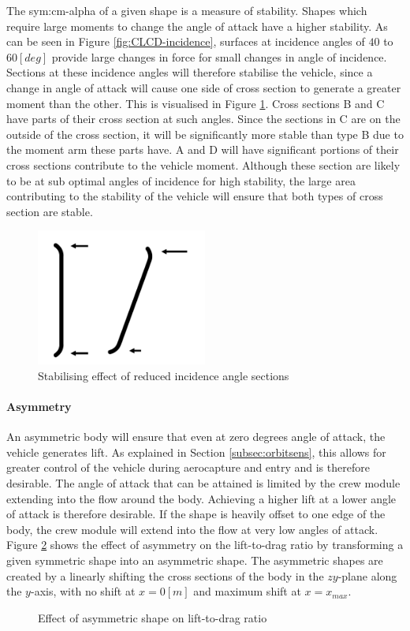 The \gls{sym:cm-alpha} of a given shape is a measure of stability. Shapes which require large moments to change the angle of attack have a higher stability. As can be seen in Figure \ref{fig:CLCD-incidence}, surfaces at incidence angles of $40$ to $60 \left[deg\right]$ provide large changes in force for small changes in angle of incidence. Sections at these incidence angles will therefore stabilise the vehicle, since a change in angle of attack will cause one side of cross section to generate a greater moment than the other. This is visualised in Figure \ref{fig:StabMom}. Cross sections B and C have parts of their cross section at such angles. Since the sections in C are on the outside of the cross section, it will be significantly more stable than type B due to the moment arm these parts have. A and D will have significant portions of their cross sections contribute to the vehicle moment. Although these section are likely to be at sub optimal angles of incidence for high stability, the large area contributing to the stability of the vehicle will ensure that both types of cross section are stable. 


\begin{figure}[h]
	\centering
	\includegraphics[width=0.5\textwidth]{./Figure/Aerodynamics/StabilizeMoment.pdf}
	\caption{Stabilising effect of reduced incidence angle sections}
	\label{fig:StabMom}
\end{figure}

\paragraph{Asymmetry}
An asymmetric body will ensure that even at zero degrees angle of attack, the vehicle generates lift. As explained in Section \ref{subsec:orbitsens}, this allows for greater control of the vehicle during aerocapture and entry and is therefore desirable. The angle of attack that can be attained is limited by the crew module extending into the flow around the body. Achieving a higher lift at a lower angle of attack is therefore desirable. If the shape is heavily offset to one edge of the body, the crew module will extend into the flow at very low angles of attack. Figure \ref{fig:LDSkew} shows the effect of asymmetry on the lift-to-drag ratio by transforming a given symmetric shape into an asymmetric shape. The asymmetric shapes are created by a linearly shifting the cross sections of the body in the $zy$-plane along the $y$-axis, with no shift at $x=0\left[m\right]$ and maximum shift at $x=x_{max}$. 

\begin{figure}[h]
	\hspace{-8mm}
	\setlength{} 
	\setlength{}
	
	\caption{Effect of asymmetric shape on lift-to-drag ratio}
	\label{fig:LDSkew}
\end{figure}
